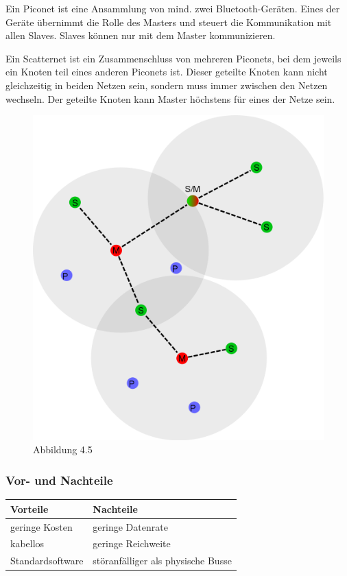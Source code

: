 Ein Piconet ist eine Ansammlung von mind. zwei Bluetooth-Geräten. Eines der Geräte übernimmt die Rolle des Masters und steuert die Kommunikation mit allen Slaves. Slaves können nur mit dem Master kommunizieren.

Ein Scatternet ist ein Zusammenschluss von mehreren Piconets, bei dem jeweils ein Knoten teil eines anderen Piconets ist. Dieser geteilte Knoten kann nicht gleichzeitig in beiden Netzen sein, sondern muss immer zwischen den Netzen wechseln. Der geteilte Knoten kann Master höchstens für eines der Netze sein.

\begin{figure}[h!]
	\includegraphics[width=0.7\linewidth]{pico_scatternet.png}
	\caption[https://de.wikipedia.org/wiki/Scatternet#/media/Datei:BluetoothScatternet-de.svg]{Abbildung 4.5}
\end{figure}

\subsubsection{Vor- und Nachteile}
\begin{tabular}{l|l}
	\textbf{Vorteile} & \textbf{Nachteile}\\
	\hline geringe Kosten & geringe Datenrate\\
	\hline kabellos & geringe Reichweite\\
	\hline Standardsoftware & störanfälliger als physische Busse\\
\end{tabular}